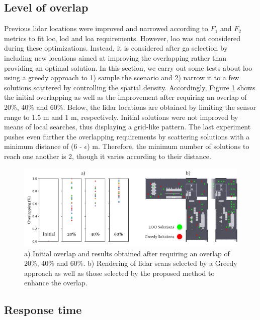 \subsection{Level of overlap}

Previous \acrshort{lidar} locations were improved and narrowed according to $F_1$ and $F_2$ metrics to fit \acrshort{loc}, \acrshort{lod} and \acrshort{loa} requirements. However, \acrshort{loo} was not considered during these optimizations. Instead, it is considered after \acrshort{ga} selection by including new locations aimed at improving the overlapping rather than providing an optimal solution. In this section, we carry out some tests about \acrshort{loo} using a greedy approach to 1) sample the scenario and 2) narrow it to a few solutions scattered by controlling the spatial density. Accordingly, Figure \ref{fig:loo_results} shows the initial overlapping as well as the improvement after requiring an overlap of 20\%, 40\% and 60\%. Below, the \acrshort{lidar} locations are obtained by limiting the sensor range to 1.5 \si{\meter} and 1 \si{\meter}, respectively. Initial solutions were not improved by means of local searches, thus displaying a grid-like pattern. The last experiment pushes even further the overlapping requirements by scattering solutions with a minimum distance of (6 - $\epsilon$) \si{\meter}. Therefore, the minimum number of solutions to reach one another is 2, though it varies according to their distance. 

\begin{figure}
    \centering
    \includegraphics[width=\linewidth]{figs/lidar_optimization/loo_results.png}
	\caption{a) Initial overlap and results obtained after requiring an overlap of 20\%, 40\% and 60\%. b) Rendering of \acrshort{lidar} scans selected by a Greedy approach as well as those selected by the proposed method to enhance the overlap. }
	\label{fig:loo_results}
\end{figure}

\subsection{Response time}

